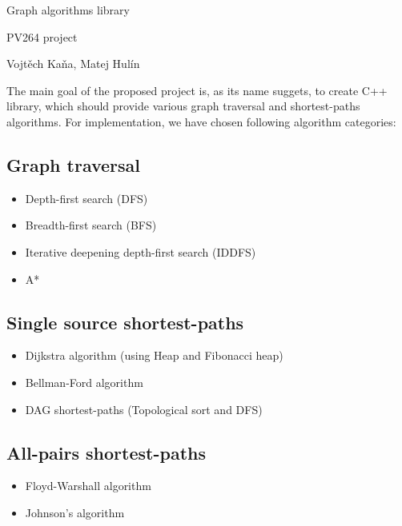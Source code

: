 \documentclass{article}
\begin{document}
\huge
\begin{center}
Graph algorithms library

\vspace{10pt}
\large
PV264 project
\vspace{10pt}

\normalsize
\foreignlanguage{czech}{Vojtěch Kaňa, Matej Hulín}
\vspace{20pt}
\end{center}

\normalsize

The main goal of the proposed project is, as its name suggets, to create C++ library, which should provide various graph traversal and shortest-paths algorithms. For implementation, we have chosen following algorithm categories:

\subsection*{Graph traversal}
\begin{itemize}
\item Depth-first search (DFS)
\item Breadth-first search (BFS)
\item Iterative deepening depth-first search (IDDFS) 
\item A*
\end{itemize}
\subsection*{Single source shortest-paths}
\begin{itemize}
\item Dijkstra algorithm (using Heap and Fibonacci heap)
\item Bellman-Ford algorithm
\item DAG shortest-paths (Topological sort and DFS)
\end{itemize}
\subsection*{All-pairs shortest-paths}
\begin{itemize}
\item Floyd-Warshall algorithm
\item Johnson's algorithm
\end{itemize}
\end{document}

